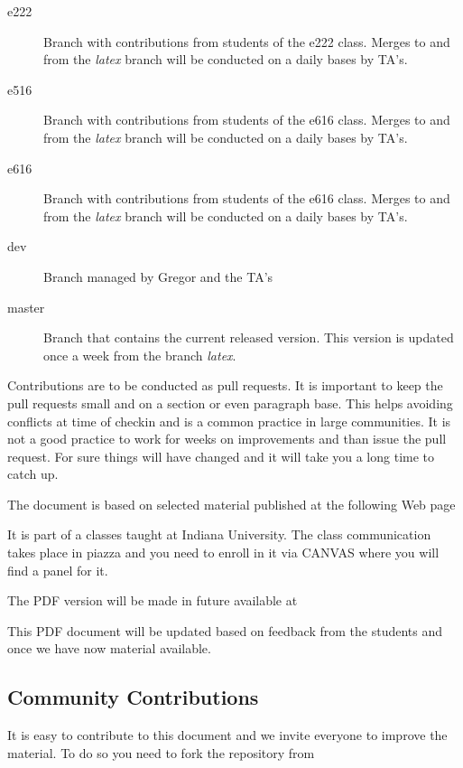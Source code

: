 \begin{enumerate}
\begin{description}
\item[e222] Branch with contributions from students of the e222
  class. Merges to and from the {\em latex} branch will be conducted
  on a daily bases by TA's.
\item[e516] Branch with contributions from students of the e616
  class. Merges to and from the {\em latex} branch will be conducted
  on a daily bases by TA's.
\item[e616] Branch with contributions from students of the e616
  class. Merges to and from the {\em latex} branch will be conducted
  on a daily bases by TA's.
\item[dev] Branch managed by Gregor and the TA's
\item[master] Branch that contains the current released version. This
  version is updated once a week from the branch {\em latex}.
\end{description}

Contributions are to be conducted as pull requests. It is important to
keep the pull requests small and on a section or even paragraph
base. This helps avoiding conflicts at time of checkin and is a common
practice in large communities. It is not a good practice to work for
weeks on improvements and than issue the pull request. For sure things
will have changed and it will take you a long time to catch up.

The document is based on selected material published at the following
Web page


It is part of a classes taught at Indiana University. The class
communication takes place in piazza and you need to enroll in it via
CANVAS where you will find a panel for it.

The PDF version will be made in future available at 


This PDF document will be updated based on feedback from the students
and once we have now material available. 

\subsection{Community Contributions}

It is easy to contribute to this document and we invite everyone to
improve the material. To do so you need to fork the repository from 


\end{enumerate}
